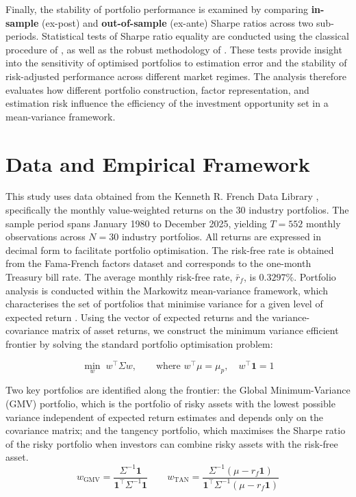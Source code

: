 \documentclass[11pt]{exam}
\begin{document}
\noindent Finally, the stability of portfolio performance is examined by comparing \textbf{in-sample} (ex-post) and \textbf{out-of-sample} (ex-ante) Sharpe ratios across two sub-periods. Statistical tests of Sharpe ratio equality are conducted using the classical procedure of \parencite{JobsonKorkie1981}, as well as the robust methodology of \parencite{LedoitWolf2008}. These tests provide insight into the sensitivity of optimised portfolios to estimation error and the stability of risk-adjusted performance across different market regimes. The analysis therefore evaluates how different portfolio construction, factor representation, and estimation risk influence the efficiency of the investment opportunity set in a mean-variance framework.

\newpage \section{Data and Empirical Framework} 
\label{sec:data}
\normalsize
\justifying This study uses data obtained from the Kenneth R. French Data Library \parencite{FrenchLibrary}, specifically the monthly value-weighted returns on the 30 industry portfolios.  \noindent The sample period spans January 1980 to December 2025, yielding $T = 552$ monthly observations across $N = 30$ industry portfolios. All returns are expressed in decimal form to facilitate portfolio optimisation. \noindent The risk-free rate is obtained from the Fama-French factors dataset and corresponds to the one-month Treasury bill rate. The average monthly risk-free rate, $\bar{r}_{f}$, is \( 0.3297\% \). \noindent Portfolio analysis is conducted within the Markowitz mean-variance framework, which characterises the set of portfolios that minimise variance for a given level of expected return \parencite{Markowitz1952}. Using the vector of expected returns and the variance-covariance matrix of asset returns, we construct the minimum variance efficient frontier by solving the standard portfolio optimisation problem:


\[ \min_{w} \; w^\top \Sigma w, \qquad \text{where } w^\top \mu = \mu_p, \quad w^\top \mathbf{1} = 1 \] 

\noindent\justifying Two key portfolios are identified along the frontier: the Global Minimum-Variance (GMV) portfolio, which is the portfolio of risky assets with the lowest possible variance independent of expected return estimates and depends only on the covariance matrix; and the tangency portfolio, which maximises the Sharpe ratio of the risky portfolio when investors can combine risky assets with the risk-free asset. \[ w_\text{GMV} = \frac{\Sigma^{-1}\mathbf{1}} {\mathbf{1}^{\top}\Sigma^{-1}\mathbf{1}} \qquad w_\text{TAN} = \frac{\Sigma^{-1}(\mu - r_f\mathbf{1})} {\mathbf{1}^{\top}\Sigma^{-1}(\mu - r_f\mathbf{1})} \] 
\end{document}
